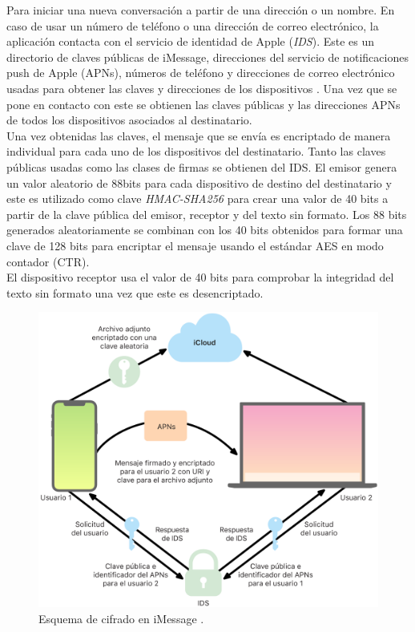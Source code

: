Para iniciar una nueva conversación a partir de una dirección o un nombre. En caso de usar un número de teléfono o una dirección de correo electrónico, la aplicación contacta con el servicio de identidad de Apple (\emph{IDS}). Este es un directorio de claves públicas de iMessage, direcciones del servicio de notificaciones push de Apple (APNs), números de teléfono y direcciones de correo electrónico usadas para obtener las claves y direcciones de los dispositivos \cite{ids}. Una vez que se pone en contacto con este se obtienen las claves públicas y las direcciones APNs de todos los dispositivos asociados al destinatario.\\
Una vez obtenidas las claves, el mensaje que se envía es encriptado de manera individual para cada uno de los dispositivos del destinatario. Tanto las claves públicas usadas como las clases de firmas se obtienen del IDS. El emisor genera un valor aleatorio de 88bits para cada dispositivo de destino del destinatario y este es utilizado como clave \emph{HMAC-SHA256} para crear una valor de 40 bits a partir de la clave pública del emisor, receptor y del texto sin formato. Los 88 bits generados aleatoriamente se combinan con los 40 bits obtenidos para formar una clave de 128 bits para encriptar el mensaje usando el estándar AES en modo contador (CTR).\\
El dispositivo receptor usa el valor de 40 bits para comprobar la integridad del texto sin formato una vez que este es desencriptado. 
\begin{figure}[htb]
	\centering
	\includegraphics[scale=0.2]{imagenes/apple.png} 
	\caption{Esquema de cifrado en iMessage \cite{apple1}.}
	\label{mtproto2}
\end{figure}
